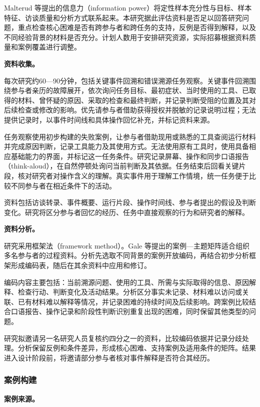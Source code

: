 Malterud 等\cite{malterud2016information}提出的信息力（information power）将定性样本充分性与目标、样本特征、访谈质量和分析方式联系起来。本研究据此评估资料是否足以回答研究问题，重点检查核心困难是否有跨参与者和跨任务的支持，反例是否得到解释，以及不同经验背景的材料是否充分。计划人数用于安排研究资源，实际招募根据资料质量和案例覆盖进行调整。

\noindent\textbf{资料收集。}

每次研究约60—90分钟，包括关键事件回溯和错误溯源任务观察。关键事件回溯围绕参与者亲历的故障展开，依次询问任务目标、最初症状、当时使用的工具、已取得的材料、曾怀疑的原因、采取的检查和最终判断，并记录判断受阻的位置及其对后续检查或修改的影响。优先请参与者借助获得授权并脱敏的记录说明过程；无法提供记录时，以事件时间线和具体操作回忆补充，并标记资料来源。

任务观察使用初步构建的失败案例，让参与者借助现用或熟悉的工具查阅运行材料并完成原因判断，记录工具能力及其使用方式。无法使用原有工具时，使用具备相应基础能力的界面，并标记这一任务条件。研究记录屏幕、操作和同步口语报告（think-aloud），在自然停顿处询问当前判断及其依据。任务结束后回看关键片段，核对研究者对操作含义的理解。真实事件用于理解工作情境，统一任务便于比较不同参与者在相近条件下的活动。

资料包括访谈转录、事件概要、运行片段、操作时间线、参与者提出的假设及判断变化。研究将区分参与者回忆的经历、任务中直接观察的行为和研究者的解释。

\noindent\textbf{资料分析。}

研究采用框架法（framework method）。Gale 等\cite{gale2013framework}提出的案例—主题矩阵适合组织多名参与者的过程资料。分析先选取不同背景的案例开放编码，再结合初步分析框架形成编码表，随后在其余资料中应用和修订。

编码内容主要包括：当前溯源问题、使用的工具、所需与实际取得的信息、原因解释、检查行动、判断变化及活动结果。分析区分事实未记录、材料难以访问或关联、已有材料难以解释等情况，并记录困难的持续时间及后续影响。跨案例比较结合口语报告、操作记录和阶段性判断识别重复出现的困难，同时保留其他类型的问题。

研究拟邀请另一名研究人员复核约四分之一的资料，比较编码依据并记录分歧处理。分析保留反例和条件差异，形成核心困难、支持案例及适用条件的矩阵。结果进入设计阶段前，将邀请部分参与者核对事件解释是否符合其经历。

\subsubsection{案例构建}

\noindent\textbf{案例来源。}


